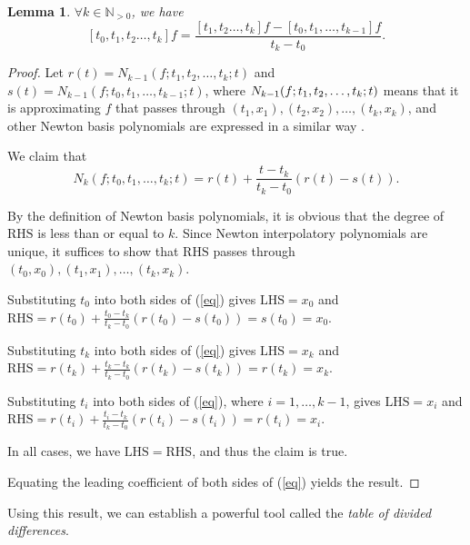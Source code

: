 \documentclass[a4paper,11pt,titlepage]{article}
\theoremstyle{definition}
\theoremstyle{plain}
\newtheorem{lemma}[theorem]{Lemma}
\theoremstyle{remark}
\begin{document}
\begin{lemma}\label{lemma52}
    $\forall k\in\mathbb{N}_{>0}$, we have $$[t_0,t_1,t_2\dots,t_k]f=\frac{[t_1,t_2\dots,t_k]f-[t_0,t_1,\dots,t_{k-1}]f}{t_k-t_0}.$$
\end{lemma}
\begin{proof}
    Let $r(t)=N_{k-1}(f;t_1,t_2,\dots,t_k;t)$ and $s(t)=N_{k-1}(f;t_0,t_1,\dots,t_{k-1};t)$, where $N_{k-1}(f;\\t_1,t_2,\dots,t_k;t)$ means that it is approximating $f$ that passes through $(t_1,x_1), (t_2,x_2), \dots, (t_k,x_k)$, and other Newton basis polynomials are expressed in a similar way \cite{Gautschi2012}.
    
    We claim that
    \begin{equation}\label{eq}
        N_k(f;t_0,t_1,\dots,t_k;t)=r(t)+\frac{t-t_k}{t_k-t_0}(r(t)-s(t)). \tag{$\ast$}
    \end{equation}

    By the definition of Newton basis polynomials, it is obvious that the degree of $\mathrm{RHS}$ is less than or equal to $k$. Since Newton interpolatory polynomials are unique, it suffices to show that $\mathrm{RHS}$ passes through $(t_0,x_0), (t_1,x_1), \dots, (t_k,x_k)$.
    
    Substituting $t_0$ into both sides of (\ref{eq}) gives $\mathrm{LHS}=x_0$ and $\mathrm{RHS}=r(t_0)+\frac{t_0-t_k}{t_k-t_0}(r(t_0)-s(t_0))=s(t_0)=x_0.$

    Substituting $t_k$ into both sides of (\ref{eq}) gives $\mathrm{LHS}=x_k$ and $\mathrm{RHS}=r(t_k)+\frac{t_k-t_k}{t_k-t_0}(r(t_k)-s(t_k))=r(t_k)=x_k.$

    Substituting $t_i$ into both sides of (\ref{eq}), where $i=1,\dots,k-1$, gives $\mathrm{LHS}=x_i$ and $\mathrm{RHS}=r(t_i)+\frac{t_i-t_k}{t_k-t_0}(r(t_i)-s(t_i))=r(t_i)=x_i.$

    In all cases, we have $\mathrm{LHS} = \mathrm{RHS}$, and thus the claim is true.

    Equating the leading coefficient of both sides of (\ref{eq}) yields the result.
\end{proof}

Using this result, we can establish a powerful tool called the \textit{table of divided differences}.
\end{document}
